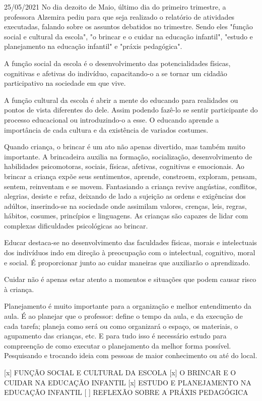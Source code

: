 \documentclass{SchoolBook}
\begin{document}
\begin{day}{25/05/2021}
        No dia dezoito de Maio, último dia do primeiro trimestre, a professora Alzemira pediu para que seja realizado o relatório de atividades executadas, falando sobre os assuntos debatidos no trimestre. Sendo eles "função social e cultural da escola", "o brincar e o cuidar na educação infantil", "estudo e planejamento na educação infantil" e "práxis pedagógica".
        
        A função social da escola é o desenvolvimento das potencialidades físicas, cognitivas e afetivas do indivíduo, capacitando-o a se tornar um cidadão participativo na sociedade em que vive.
        
        A função cultural da escola é abrir a mente do educando para realidades ou pontos de vista diferentes do dele. Assim podendo fazê-lo se sentir participante do processo educacional ou introduzindo-o a esse. O educando aprende a importância de cada cultura e da existência de variados costumes.
        
        Quando criança, o brincar é um ato não apenas divertido, mas também muito importante. A brincadeira auxilia na formação, socialização, desenvolvimento de habilidades psicomotoras, sociais, físicas, afetivas, cognitivas e emocionais. Ao brincar a criança expõe seus sentimentos, aprende, constroem, exploram, pensam, sentem, reinventam e se movem. Fantasiando a criança revive angústias, conflitos, alegrias, desiste e refaz, deixando de lado a sujeição as ordens e exigências dos adúltos, inserindo-se na sociedade onde assimilam valores, crenças, leis, regras, hábitos, cosumes, princípios e linguagens. As crianças são capazes de lidar com complexas dificuldades psicológicas ao brincar.
        
        Educar destaca-se no desenvolvimento das faculdades físicas, morais e intelectuais dos indivíduos indo em direção à preocupação com o intelectual, cognitivo, moral e social. É proporcionar junto ao cuidar maneiras que auxiliarão o aprendizado.
        
        Cuidar não é apenas estar atento a momentos e situações que podem causar risco à criança.
        
        Planejamento é muito importante para a organização e melhor entendimento da aula. É ao planejar que o professor: define o tempo da aula, e da execução de cada tarefa; planeja como será ou como organizará o espaço, os materiais, o agupamento das crianças, etc. E para tudo isso é necessário estudo para compreenção de como executar o planejamento da melhor forma possível. Pesquisando e trocando ideia com pessoas de maior conhecimento ou até do local.
        
        
        
        
        [x] FUNÇÃO SOCIAL E CULTURAL DA ESCOLA
        [x] O BRINCAR E O CUIDAR NA EDUCAÇÃO INFANTIL
        [x] ESTUDO E PLANEJAMENTO NA EDUCAÇÃO INFANTIL
        [ ] REFLEXÃO SOBRE A PRÁXIS PEDAGÓGICA
    \end{day}
    
\end{document}
